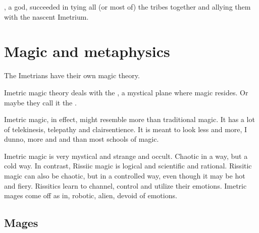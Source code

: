 , a \nycan{} god, succeeded in tying all (or most of) the tribes together and allying them with the nascent Imetrium. 









\section{Magic and metaphysics}
The Imetrians have their own magic theory. 

Imetric magic theory deals with the , a mystical plane where magic resides.
Or maybe they call it the . 

Imetric magic, in effect, might resemble  more than traditional magic. 
It has a lot of telekinesis, telepathy and clairsentience. 
It is meant to look less  and more, I dunno, more  and  and  than most schools of magic. 

Imetric magic is very mystical and strange and occult. Chaotic in a way, but a cold way.
In contrast, Rissiic magic is logical and scientific and rational.
Rissitic magic can also be chaotic, but in a controlled way, even though it may be hot and fiery.
Rissitics learn to channel, control and utilize their emotions.
Imetric mages come off as in\human, robotic, alien, devoid of emotions.






\subsection{Mages}

